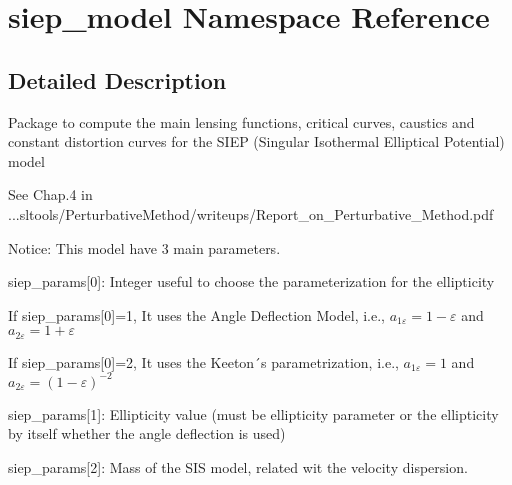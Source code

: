 \hypertarget{namespacesiep__model}{
\section{siep\_\-model Namespace Reference}
\label{namespacesiep__model}
}


\subsection{Detailed Description}
Package to compute the main lensing functions, critical curves, caustics and constant distortion curves for the SIEP (Singular Isothermal Elliptical Potential) model

See Chap.4 in ...sltools/PerturbativeMethod/writeups/Report\_\-on\_\-Perturbative\_\-Method.pdf

Notice: This model have 3 main parameters.

siep\_\-params\mbox{[}0\mbox{]}: Integer useful to choose the parameterization for the ellipticity

If siep\_\-params\mbox{[}0\mbox{]}=1, It uses the Angle Deflection Model, i.e., $ a_{1\varepsilon}=1-\varepsilon $ and $ a_{2\varepsilon}=1+\varepsilon $

If siep\_\-params\mbox{[}0\mbox{]}=2, It uses the Keeton´s parametrization, i.e., $ a_{1\varepsilon}=1$ and $ a_{2\varepsilon}=(1-\varepsilon)^{-2} $

siep\_\-params\mbox{[}1\mbox{]}: Ellipticity value (must be ellipticity parameter or the ellipticity by itself whether the angle deflection is used)

siep\_\-params\mbox{[}2\mbox{]}: Mass of the SIS model, related wit the velocity dispersion. 
